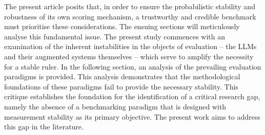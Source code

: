 The present article posits that, in order to ensure the probabilistic stability and robustness of its own scoring mechanism, a trustworthy and credible benchmark must prioritise these considerations. The ensuing sections will meticulously analyse this fundamental issue. The present study commences with an examination of the inherent instabilities in the objects of evaluation – the LLMs and their augmented systems themselves – which serve to amplify the necessity for a stable ruler. In the following section, an analysis of the prevailing evaluation paradigms is provided. This analysis demonstrates that the methodological foundations of these paradigms fail to provide the necessary stability. This critique establishes the foundation for the identification of a critical research gap, namely the absence of a benchmarking paradigm that is designed with measurement stability as its primary objective. The present work aims to address this gap in the literature.

